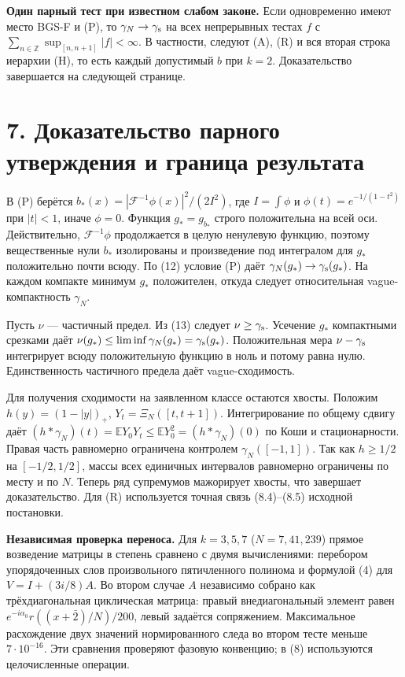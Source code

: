 \documentclass[11pt,a4paper]{article}
\newcommand{\EE}{\mathbb E}
\newcommand{\Z}{\mathbb Z}
\newcommand{\sect}[1]{\section*{\sffamily\color{ink}#1}}
\newcommand{\subt}[1]{\par\medskip\noindent\textbf{#1.}\quad}
\begin{document}
\subt{Один парный тест при известном слабом законе} Если одновременно имеют место BGS-F и (P), то $\gamma_N\to\gamma_{\rm s}$ на всех непрерывных тестах $f$ с $\sum_{n\in\Z}\sup_{[n,n+1]}|f|<\infty$. В частности, следуют (A), (R) и вся вторая строка иерархии (H), то есть каждый допустимый $b$ при $k=2$. Доказательство завершается на следующей странице.
\newpage
\sect{7. Доказательство парного утверждения и граница результата}
В (P) берётся $b_*(x)=|\mathcal F^{-1}\phi(x)|^2/(2I^2)$, где $I=\int\phi$ и $\phi(t)=e^{-1/(1-t^2)}$ при $|t|<1$, иначе $\phi=0$. Функция $g_*=g_{b_*}$ строго положительна на всей оси. Действительно, $\mathcal F^{-1}\phi$ продолжается в целую ненулевую функцию, поэтому вещественные нули $b_*$ изолированы и произведение под интегралом для $g_*$ положительно почти всюду. По (12) условие (P) даёт $\gamma_N(g_*)\to\gamma_{\rm s}(g_*)$. На каждом компакте минимум $g_*$ положителен, откуда следует относительная vague-компактность $\gamma_N$.

Пусть $\nu$ --- частичный предел. Из (13) следует $\nu\ge\gamma_{\rm s}$. Усечение $g_*$ компактными срезками даёт
$\nu(g_*)\le\liminf\gamma_N(g_*)=\gamma_{\rm s}(g_*)$. Положительная мера $\nu-\gamma_{\rm s}$ интегрирует всюду положительную функцию в ноль и потому равна нулю. Единственность частичного предела даёт vague-сходимость.

Для получения сходимости на заявленном классе остаются хвосты. Положим $h(y)=(1-|y|)_+$, $Y_t=\Xi_N([t,t+1])$. Интегрирование по общему сдвигу даёт $(h*\gamma_N)(t)=\EE Y_0Y_t\le\EE Y_0^2=(h*\gamma_N)(0)$ по Коши и стационарности. Правая часть равномерно ограничена контролем $\gamma_N([-1,1])$. Так как $h\ge1/2$ на $[-1/2,1/2]$, массы всех единичных интервалов равномерно ограничены по месту и по $N$. Теперь ряд супремумов мажорирует хвосты, что завершает доказательство. Для (R) используется точная связь (8.4)--(8.5) исходной постановки.

\subt{Независимая проверка переноса} Для $k=3,5,7$ ($N=7,41,239$) прямое возведение матрицы в степень сравнено с двумя вычислениями: перебором упорядоченных слов произвольного пятичленного полинома и формулой (4) для $V=I+(3i/8)A$. Во втором случае $A$ независимо собрано как трёхдиагональная циклическая матрица: правый внедиагональный элемент равен $e^{-i\alpha_0}r((x+\bar2)/N)/200$, левый задаётся сопряжением. Максимальное расхождение двух значений нормированного следа во втором тесте меньше $7\cdot10^{-16}$. Эти сравнения проверяют фазовую конвенцию; в (8) используются целочисленные операции.
\end{document}
